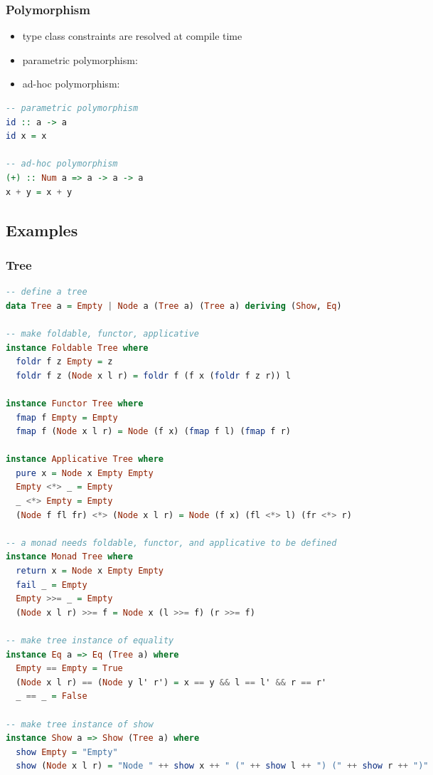 \documentclass[a4paper,landscape,10pt]{article}
\begin{document}
\begin{multicols*}{2}
  \subsubsection{Polymorphism}

  \begin{itemize}
    \item type class constraints are resolved at compile time
    \item parametric polymorphism: 
    \item ad-hoc polymorphism: 
  \end{itemize}

  \begin{lstlisting}[language=Haskell]
-- parametric polymorphism
id :: a -> a
id x = x

-- ad-hoc polymorphism
(+) :: Num a => a -> a -> a
x + y = x + y
  \end{lstlisting}

  \breakcolumn

  \subsection{Examples}

  \subsubsection{Tree}

  \begin{lstlisting}[language=Haskell]
-- define a tree
data Tree a = Empty | Node a (Tree a) (Tree a) deriving (Show, Eq)

-- make foldable, functor, applicative
instance Foldable Tree where
  foldr f z Empty = z
  foldr f z (Node x l r) = foldr f (f x (foldr f z r)) l

instance Functor Tree where
  fmap f Empty = Empty
  fmap f (Node x l r) = Node (f x) (fmap f l) (fmap f r)

instance Applicative Tree where
  pure x = Node x Empty Empty
  Empty <*> _ = Empty
  _ <*> Empty = Empty
  (Node f fl fr) <*> (Node x l r) = Node (f x) (fl <*> l) (fr <*> r)

-- a monad needs foldable, functor, and applicative to be defined
instance Monad Tree where
  return x = Node x Empty Empty
  fail _ = Empty
  Empty >>= _ = Empty
  (Node x l r) >>= f = Node x (l >>= f) (r >>= f)

-- make tree instance of equality
instance Eq a => Eq (Tree a) where
  Empty == Empty = True
  (Node x l r) == (Node y l' r') = x == y && l == l' && r == r'
  _ == _ = False

-- make tree instance of show
instance Show a => Show (Tree a) where
  show Empty = "Empty"
  show (Node x l r) = "Node " ++ show x ++ " (" ++ show l ++ ") (" ++ show r ++ ")"
\end{lstlisting}

\end{multicols*}
\end{document}
